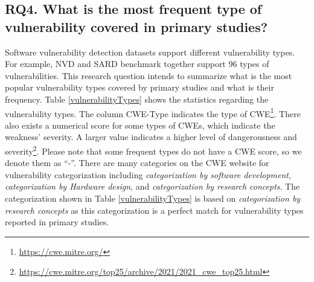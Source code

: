 \subsection{RQ4. What is the most frequent type of vulnerability covered in primary studies?}

Software vulnerability detection datasets support different vulnerability types. For example, NVD and SARD benchmark together support 96 types of vulnerabilities. This research question intends to summarize what is the most popular vulnerability types covered by primary studies and what is their frequency. Table \ref{vulnerabilityTypes} shows the statistics regarding the vulnerability types. The column CWE-Type indicates the type of CWE\footnote{\url{https://cwe.mitre.org/}}. There also exists a numerical score for some types of CWEs, which indicate the weakness’ severity. A larger value indicates a higher level of dangerousness and severity\footnote{\url{https://cwe.mitre.org/top25/archive/2021/2021_cwe_top25.html}}. Please note that some frequent types do not have a CWE score, so we denote them as ``-''. There are many categories on the CWE website for vulnerability categorization including \textit{categorization by software development}, \textit{categorization by Hardware design}, and \textit{categorization by research concepts}. The categorization shown in Table \ref{vulnerabilityTypes} is based on \textit{categorization by research concepts} as this categorization is a perfect match for vulnerability types reported in primary studies. 


